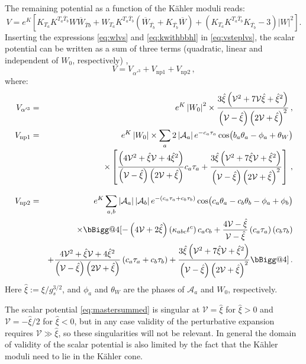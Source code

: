 \documentclass[12pt,a4wide]{article}
\makeatletter
\newcommand{\vast}{\bBigg@{4}}
\newcommand{\vastl}{\mathopen\vast}
\newcommand{\vastr}{\mathclose\vast}
\def\xih{{\hat \xi}}
\def\V{\mathcal{V}}
\def\be{\begin{equation}}
\def\ee{\end{equation}}
\makeatother
\begin{document}
The remaining potential as a function of the K\"ahler moduli reads:
\be\label{eq:vsteplvs}
V=e^K\left[ K_{T_a}K^{T_a\overline{T}_b}W\overline{W}_{\overline{T}b}+W_{T_a}K^{T_a\overline{T}_b}\left(\overline{W}_{\overline{T_b}}+K_{\overline{T_b}}\overline{W}\right)+\left(K_{T_a}K^{T_a\overline{T}_b}K_{\overline{T_b}}-3 \right)\left | W \right |^2\right].
\ee
Inserting the expressions \eqref{eq:wlvs} and \eqref{eq:kwithbbhl} in \eqref{eq:vsteplvs}, the scalar potential can be written as a sum of three terms (quadratic, linear and independent of $W_0$, respectively) \cite{AbdusSalam:2020ywo},
\be \label{eq:mastersummed}
V=V_{\alpha'^3}+V_{\text{np1}}+ V_{\text{np2}}\,,
\ee
where:  
\begin{eqnarray}\label{master}
    V_{\alpha'^3}&=& e^K\left | W_0 \right |^2 \times \frac{3\xih\left(\V^2+7\V\xih +\xih^2\right)}{\left(\V-\xih \right)\left(2\V+\xih \right)^2}\,, \label{eq:ftmast}\\
    V_{\text{np1}} &=&  e^K \left | W_0\right | \times \sum_a 2 \left | \mathcal{A}_a\right | e^{-c_a\tau_a}\cos\bigl( b_a\theta_a -\phi_a +\theta_W\bigr) \nonumber  \\[-2pt] 
    &&\times \left[\frac{\left(4\V^2+\xih\V +4\xih^2 \right)}{\left( \V-\xih\right)\left( 2\V+\xih\right)}c_a\tau_a
    +\frac{3\xih \left(\V^2+7\xih \V+\xih^2\right)}{\left(\V-\xih\right)\left(2\V+\xih \right)^2}\right]\,,  \label{eq:stmast} \\[8pt]
    V_{\text{np2}} &=& e^K\sum_{a,b}\left |\mathcal{A}_a\right | \left |\mathcal{A}_b\right | e^{-\left(c_a\tau_a + c_b\tau_b\right)}\cos\bigl(c_a\theta_a-c_b\theta_b -\phi_a +\phi_b \bigr)\nonumber \\
    &&\times \vastl[-\left(4\V+2\xih\right) \left(\kappa_{abc}t^c\right) c_a c_b + \frac{4\V-\xih}{\V-\xih}\left( c_a\tau_a\right)\left(c_b\tau_b\right)\nonumber \\
     && + \frac{4\V^2+\xih \V + 4 \xih^2}{\left (\V-\xih \right)\left(2\V+\xih \right)}\left(c_a\tau_a+c_b \tau_b \right) +\frac{3\xih \left ( \V^2 + 7\xih \V + \xih^2 \right)}{\left (\V-\xih \right)\left(2\V+\xih \right)^2}\vastr]\,. \label{eq:ttmast}
\end{eqnarray}
Here $\xih:= \xi/g_s^{3/2}$, and $\phi_a$ and $\theta_W$ are the phases of $\mathcal{A}_a$ and $W_0$, respectively.


The scalar potential \eqref{eq:mastersummed} is singular at $\V=\xih$ for $\xih>0$ and $\V=-\xih/2$ for $\xih<0$,
but in any case validity of the perturbative expansion requires $\V \gg \xih$, so these singularities will not be relevant.  
In general the domain of validity of the scalar potential is also limited by the fact that the K\"ahler moduli need to lie in the K\"ahler cone.
\end{document}
